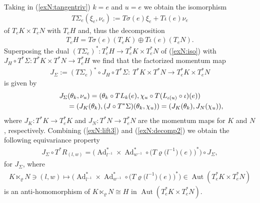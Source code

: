 \documentclass[pdftex]{sigma}
\renewcommand{\to}{\rightarrow}
\DeclareMathOperator{\Ad}{Ad}
\newcommand{\Aut}{\operatorname{Aut}}
\numberwithin{equation}{section}
\begin{document}
 Taking in (\ref{exN:tangentriv}) $k=e$ and $u=e$ we obtain the isomorphism
 \begin{gather}\label{exN:iso} T\Sigma_e(\xi_e,\nu_e):=T\sigma(e)\xi_e+T\iota(e)\nu_e\end{gather}
 of $T_eK\times T_eN$ with $T_eH$ and, thus the decomposition
 \begin{gather*}%
 T_eH=T\sigma(e)(T_eK)\oplus T\iota(e)(T_eN).\end{gather*}
 Superposing the dual $(T\Sigma_e)^*\colon T_e^*H\to T_e^*K\times T_e^*N$ of (\ref{exN:iso}) with $J_H\circ T^*\Sigma\colon T^*K\times T^*N\to T^*_eH$ we f\/ind that the factorized momentum map
\begin{gather*} J_\Sigma:=(T\Sigma_e)^*\circ J_H\circ T^*\Sigma\colon \ T^*K\times T^*N\to T^*_eK\times T^*_eN\end{gather*}
is given by
\begin{gather}
J_\Sigma(\theta_k,\nu_u)=(\theta_k\circ TL_k(e),\chi_u\circ T(L_{\iota(u)}\circ\iota)(e))\nonumber\\
\hphantom{J_\Sigma(\theta_k,\nu_u)}{} =(J_K(\theta_k),(J\circ T^*\Sigma)(\theta_k,\chi_u))=(J_K(\theta_k),J_N(\chi_u)),\label{exN:decomp2}
\end{gather}
where $J_K\colon T^*K\to T^*_eK$ and $J_N\colon T^*N\to T^*_eN$ are the momentum maps for $K$ and $N$, respectively.
 Combining (\ref{exN:lift3}) and (\ref{exN:decomp2}) we obtain the following equivariance property
 \begin{gather}\label{exN:morphism0} J_\Sigma\circ T^*R_{(l,w)}=\big(\Ad^*_{l^{-1}}\times \Ad^*_{w^{-1}}\circ\big(T\varrho\big(l^{-1}\big)(e)\big)^*\big)\circ J_\Sigma,\end{gather}
for $J_\Sigma$, where
\begin{gather*} \label{exN:morphism}K\ltimes_\varrho N\ni(l,w) \mapsto\big(\Ad^*_{l^{-1}}\times \Ad^*_{w^{-1}}\circ\big(T\varrho\big(l^{-1}\big)(e)\big)^*\big)\in \Aut(T^*_eK\times T^*_eN)\end{gather*}
 is an anti-homomorphism of $K\ltimes_\varrho N\cong H$ in $\Aut(T^*_eK\times T^*_eN)$.
\end{document}
